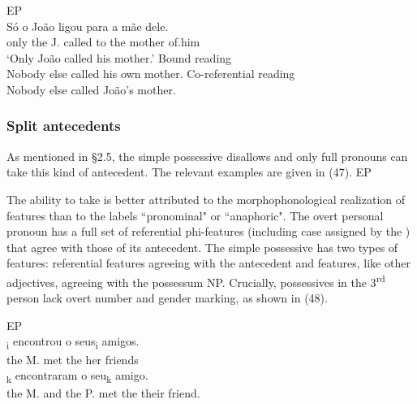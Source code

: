 \documentclass[output=paper]{langsci/langscibook}
\begin{document}
\ea%
         EP\label{ex:wein:46}\\
    \ea  
    \gll Só o João ligou para a mãe dele.  \\
         only the J. called to the mother of.him\\
    \glt ‘Only João called his mother.’
    \ex  Bound reading\\
         Nobody else called his own mother.
    \ex  Co-referential reading\\
         Nobody else called João’s mother.
    \z
\z



\subsubsection{Split antecedents}%

As mentioned in §2.5, the simple possessive disallows  and only full pronouns can take this kind of antecedent. The relevant examples are given in (47).
\pagebreak
\ea%
         EP\label{ex:wein:47}\\
    \z
\z

The ability to take  is better attributed to the morphophonological realization of features than to the labels “pronominal" or “anaphoric". The overt personal pronoun has a full set of referential phi-features (including case assigned by the ) that agree with those of its antecedent. The simple possessive has two types of features: referential features agreeing with the antecedent and  features, like other adjectives, agreeing with the possessum NP. Crucially, possessives in the 3\textsuperscript{rd} person lack overt number and gender marking, as shown in (48).

\ea%
         EP\label{ex:wein:48}\\
    \ea  
    \gll \relax [A Maria]\textsubscript{i} encontrou o seus\textsubscript{i} amigos.\\
         the M. met the her friends\\
    \ex  
    \gll {}\textsubscript{k} encontraram o seu\textsubscript{k} amigo.\\
         the M. and the P. met the their friend.\\
    \z
\z
\end{document}
